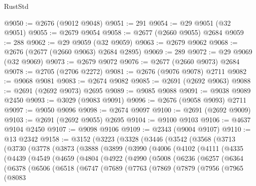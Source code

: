 \begin{lexlean}{RustStd}
\begin{coremodule}
@9050 := @2676 (@9012 @9048)
@9051 := 291
@9054 := @29 @9051 (@32 @9051)
@9055 := @2679 @9054
@9058 := @2677 (@2660 @9055) @2684
@9059 := 288
@9062 := @29 @9059 (@32 @9059)
@9063 := @2679 @9062
@9068 := @2676 (@2677 (@2660 @9063) @2684 @2895)
@9069 := 289
@9072 := @29 @9069 (@32 @9069)
@9073 := @2679 @9072
@9076 := @2677 (@2660 @9073) @2684
@9078 := @2705 (@2706 @2272)
@9081 := @2676 (@9076 @9078) @2711
@9082 := @9068 @9081
@9083 := @2674 @9082
@9085 := @2691 (@2692 @9063)
@9088 := @2691 (@2692 @9073) @2695
@9089 := @9085 @9088
@9091 := @9038 @9089 @2450
@9093 := @3029 (@9083 @9091)
@9096 := @2676 (@9058 @9093) @2711
@9097 := @9050 @9096
@9098 := @2674 @9097
@9100 := @2691 (@2692 @9009)
@9103 := @2691 (@2692 @9055) @2695
@9104 := @9100 @9103
@9106 := @4637 @9104 @2450
@9107 := @9098 @9106
@9109 := @2343 (@9004 @9107)
@9110 := @13 @2342
@9158 := @3152
    (@3223
      (@3328
        (@3446
          (@3542
            (@3568
              (@3713
                (@3730
                  (@3778
                    (@3873
                      (@3888
                        (@3899
                          (@3990
                            (@4006
                              (@4102
                                (@4111
                                  (@4335
                                    (@4439
                                      (@4549
                                        (@4659
                                          (@4804
                                            (@4922
                                              (@4990
                                                (@5008
                                                  (@6236
                                                    (@6257
                                                      (@6364
                                                        (@6378
                                                          (@6506
                                                            (@6518
                                                              (@6747
                                                                (@7689
                                                                  (@7763
                                                                    (@7869
                                                                      (@7879
                                                                        (@7956
                                                                          (@7965
                                                                            (@8083

\end{coremodule}
\end{lexlean}
